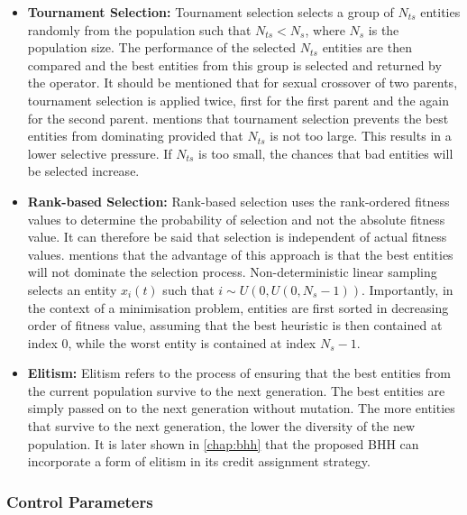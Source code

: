 \begin{itemize}
      \item \textbf{Tournament Selection: } Tournament selection selects a group of $N_{ts}$ entities randomly from the population such that $N_{ts} < N_{s}$, where $N_{s}$ is the population size. The performance of the selected $N_{ts}$ entities are then compared and the best entities from this group is selected and returned by the operator. It should be mentioned that for sexual crossover of two parents, tournament selection is applied twice, first for the first parent and the again for the second parent. \citeauthor{ref:engelbrecht:2007}\cite{ref:engelbrecht:2007} mentions that tournament selection prevents the best entities from dominating provided that $N_{ts}$ is not too large. This results in a lower selective pressure. If $N_{ts}$ is too small, the chances that bad entities will be selected increase.

      \item \textbf{Rank-based Selection: } Rank-based selection uses the rank-ordered fitness values to determine the probability of selection and not the absolute fitness value. It can therefore be said that selection is independent of actual fitness values. \citeauthor{ref:engelbrecht:2007}\cite{ref:engelbrecht:2007} mentions that the advantage of this approach is that the best entities will not dominate the selection process. Non-deterministic linear sampling selects an entity $x_{i}(t)$ such that $i \sim U(0, U(0, N_{s} - 1))$. Importantly, in the context of a minimisation problem, entities are first sorted in decreasing order of fitness value, assuming that the best heuristic is then contained at index 0, while the worst entity is contained at index $N_{s} - 1$.

      \item \textbf{Elitism: } Elitism refers to the process of ensuring that the best entities from the current population survive to the next generation. The best entities are simply passed on to the next generation without mutation. The more entities that survive to the next generation, the lower the diversity of the new population. It is later shown in \ref{chap:bhh} that the proposed \ac{BHH} can incorporate a form of elitism in its credit assignment strategy.
\end{itemize}


\subsubsection{Control Parameters}
\label{sec:heuristics:mh:ga:control_parameters}

